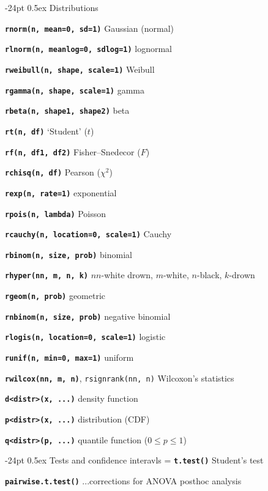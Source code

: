 \documentclass[8pt,landscape]{article}
\makeatletter
\renewcommand\section{\@startsection{section}{1}{0mm}%
                                     {-24pt}%
                                     {0.5ex}%
                                {\color{blue}\normalfont\large\bfseries}}
\newcommand{\code}{\texttt}
\newcommand{\bcode}[1]{\texttt{\textbf{#1}}}
\makeatother
\begin{document}
\begin{multicols*}{3}


\section{Distributions}

\bcode{rnorm(n, mean=0, sd=1)} Gaussian (normal)  

\bcode{rlnorm(n, meanlog=0, sdlog=1)} lognormal  

\bcode{rweibull(n, shape, scale=1)} Weibull

\bcode{rgamma(n, shape, scale=1)} gamma  

\bcode{rbeta(n, shape1, shape2)} beta

\bcode{rt(n, df)} `Student' ($t$)  

\bcode{rf(n, df1, df2)} Fisher--Snedecor ($F$)

\bcode{rchisq(n, df)} Pearson   ($\chi^2$)  

\bcode{rexp(n, rate=1)} exponential

\bcode{rpois(n, lambda)} Poisson

\bcode{rcauchy(n, location=0, scale=1)} Cauchy  

\bcode{rbinom(n, size, prob)} binomial  

\bcode{rhyper(nn, m, n, k)} $nn$-white drown, $m$-white, $n$-black, $k$-drown

\bcode{rgeom(n, prob)} geometric  

\bcode{rnbinom(n, size, prob)} negative binomial  

\bcode{rlogis(n, location=0, scale=1)} logistic  

\bcode{runif(n, min=0, max=1)} uniform  

\bcode{rwilcox(nn, m, n)}, \code{rsignrank(nn, n)} Wilcoxon's statistics  

\bcode{d<distr>(x, ...)} density function

\bcode{p<distr>(x, ...)} distribution (CDF)

\bcode{q<distr>(p, ...)} quantile function ($0 \le p \le 1$)




\section{Tests and confidence interavls}
\everypar={\hangindent=9mm}
\bcode{t.test()} Student's test

\bcode{pairwise.t.test()} ...corrections for ANOVA posthoc analysis


\end{multicols*}
\end{document}
